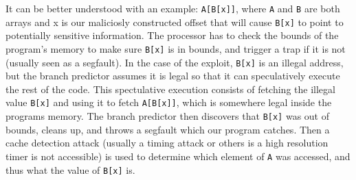 \documentclass[12pt,letterpaper]{article}
\begin{document}
It can be better understood with an example: \lstinline{A[B[x]]}, where \lstinline{A} and
\lstinline{B} are both arrays and x is our maliciosly constructed offset that will cause
\lstinline{B[x]} to point to potentially sensitive information. The processor has to check the
bounds of the program's memory to make sure \lstinline{B[x]} is in bounds, and trigger a trap if it
is not (usually seen as a segfault). In the case of the exploit, \lstinline{B[x]} is an illegal
address, but the branch predictor assumes it is legal so that it can speculatively execute the rest
of the code. This spectulative execution consists of fetching the illegal value \lstinline{B[x]} and
using it to fetch \lstinline{A[B[x]]}, which is somewhere legal inside the programs memory. The
branch predictor then discovers that \lstinline{B[x]} was out of bounds, cleans up, and throws a
segfault which our program catches. Then a cache detection attack (usually a timing attack or others
is a high resolution timer is not accessible) is used to determine which element of \lstinline{A}
was accessed, and thus what the value of \lstinline{B[x]} is.
\end{document}
